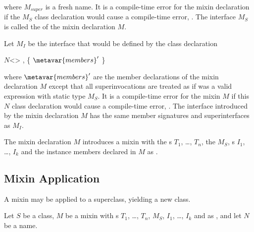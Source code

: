 \documentclass[makeidx]{article}
\begin{document}
\noindent
where $M_{super}$ is a fresh name.
It is a compile-time error for the mixin declaration if the $M_S$
class declaration would cause a compile-time error,
.
The interface $M_S$ is called the
 of the mixin declaration $M$.

\LMHash{}%
Let $M_I$ be the interface that would be defined by the class declaration

\begin{normativeDartCode}
\ABSTRACT{} \CLASS{} $N$<\TypeParametersStd>
    \IMPLEMENTS{} ,  \{
  $\metavar{members}'$
\}
\end{normativeDartCode}

where $\metavar{members}'$ are the member declarations of
the mixin declaration $M$ except that all superinvocations are treated
as if \SUPER{} was a valid expression with static type $M_S$.
It is a compile-time error for the mixin $M$ if this $N$ class
declaration would cause a compile-time error, .
The interface introduced by the mixin declaration $M$ has the same member
signatures and superinterfaces as $M_I$.

\LMHash{}%
The mixin declaration $M$ introduces a mixin
with the s $T_1$, \ldots, $T_n$,
the  $M_S$,
s $I_1$, \ldots, $I_k$
and the instance members declared in $M$ as .


\subsection{Mixin Application}

\LMHash{}%
A mixin may be applied to a superclass, yielding a new class.

\LMHash{}%
Let $S$ be a class,
$M$ be a mixin with s $T_1$, \ldots, $T_n$,
 $M_S$,
 $I_1$, \ldots, $I_k$ and
 as ,
and let $N$ be a name.
\end{document}

